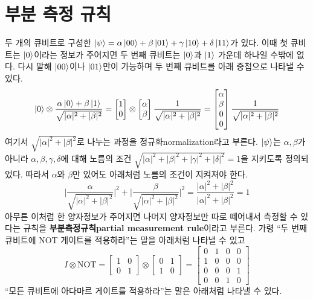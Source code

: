 \documentclass[a4paper,chapter,atbegshi]{oblivoir}
\begin{document}
\chapter{부분 측정 규칙}
두 개의 큐비트로 구성한 $\ket{\psi} = \alpha\ket{00}+\beta\ket{01}+
\gamma\ket{10}+\delta\ket{11}$가 있다. 이때
첫 큐비트는 $\ket0$이라는 정보가 주어지면 두 번째
큐비트는 $\ket0$과 $\ket1$ 가운데 하나일 수밖에 없다.
다시 말해 $\ket{00}$이나 $\ket{01}$만이 가능하며
두 번째 큐비트를 아래 중첩으로 나타낼 수 있다. 
\begin{equation}\label{eq:2-1}
  \ket0\otimes\frac{\alpha\ket0+\beta\ket1}{\sqrt{|\alpha|^2+|\beta|^2}}
  = \begin{bmatrix}1\\0\end{bmatrix}\otimes
  \begin{bmatrix}\alpha\\\beta\end{bmatrix}\frac{1}{\sqrt{|\alpha|^2+|\beta|^2}}
  = \begin{bmatrix}\alpha\\\beta\\0\\0\end{bmatrix}\frac{1}{\sqrt{|\alpha|^2+|\beta|^2}}
\end{equation}
여기서 $\sqrt{|\alpha|^2+|\beta|^2}$로 나누는 과정을 
정규화{\tiny normalization}라고
부른다. $\ket{\psi}$는 $\alpha,\beta$가 아니라 $\alpha,\beta,\gamma,\delta$에
대해 노름의 조건 $\sqrt{|\alpha|^2+|\beta|^2+|\gamma|^2+|\delta|^2}=1$을 지키도록
정의되었다. 따라서 $\alpha$와 $\beta$만 있어도 아래처럼 노름의 조건이 
지켜져야 한다. 
\[
  \Bigg\lvert\frac{\alpha}{\sqrt{|\alpha|^2+|\beta|^2}}\Bigg\rvert^2 +
  \Bigg\lvert\frac{\beta}{\sqrt{|\alpha|^2+|\beta|^2}}\Bigg\rvert^2
  =
  \frac{|\alpha|^2+|\beta|^2}{|\alpha|^2+|\beta|^2}=1
\]
아무튼 이처럼 한 양자정보가 주어지면 나머지 양자정보만
따로 떼어내서 측정할 수 있다는 규칙을 
\textbf{부분측정규칙\tiny partial measurement rule}이라고 부른다.
가령 ``두 번째 큐비트에 NOT 게이트를 적용하라''는
말을 아래처럼 나타낼 수 있고
\[
  I\otimes \textrm{NOT} = \begin{bmatrix}1 & 0 \\ 0 & 1\end{bmatrix}
  \otimes \begin{bmatrix}0 & 1 \\ 1 & 0\end{bmatrix}=
  \begin{bmatrix}0&1&0&0\\1&0&0&0\\0&0&0&1\\0&0&1&0\end{bmatrix}
\]
``모든 큐비트에 아다마르 게이트를 적용하라''는 말은 아래처럼 나타낼 수 있다.
\end{document}
